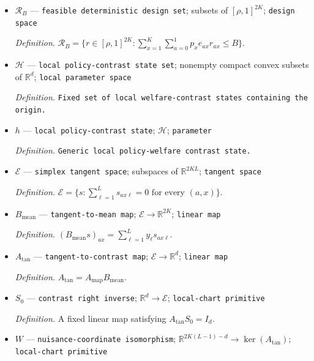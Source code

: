 \documentclass{article}
\begin{document}
\begin{itemize}
  \par\smallskip\noindent\emph{Definition.} \texttt{Maximum expected main-\allowbreak{}wave labeled fraction.}
  \item \(\mathcal R_B\) --- \texttt{feasible deterministic design set}; subsets of \([\rho,1]^{2K}\); \texttt{design space}
  \par\smallskip\noindent\emph{Definition.} \(\mathcal R_B=\{r\in[\rho,1]^{2K}:\sum_{x=1}^{K}\sum_{a=0}^{1}p_xe_{ax}r_{ax}\le B\}\).
  \item \(\mathcal H\) --- \texttt{local policy-\allowbreak{}contrast state set}; nonempty compact convex subsets of \(\mathbb R^d\); \texttt{local parameter space}
  \par\smallskip\noindent\emph{Definition.} \texttt{Fixed set of local welfare-\allowbreak{}contrast states containing the origin.}
  \item \(h\) --- \texttt{local policy-\allowbreak{}contrast state}; \(\mathcal H\); \texttt{parameter}
  \par\smallskip\noindent\emph{Definition.} \texttt{Generic local policy-\allowbreak{}welfare contrast state.}
  \item \(\mathcal E\) --- \texttt{simplex tangent space}; subspaces of \(\mathbb R^{2KL}\); \texttt{tangent space}
  \par\smallskip\noindent\emph{Definition.} \(\mathcal E=\{s:\sum_{\ell=1}^{L}s_{ax\ell}=0\text{ for every }(a,x)\}\).
  \item \(B_{\mathrm{mean}}\) --- \texttt{tangent-\allowbreak{}to-\allowbreak{}mean map}; \(\mathcal E\to\mathbb R^{2K}\); \texttt{linear map}
  \par\smallskip\noindent\emph{Definition.} \((B_{\mathrm{mean}}s)_{ax}=\sum_{\ell=1}^{L}y_\ell s_{ax\ell}\).
  \item \(A_{\mathrm{tan}}\) --- \texttt{tangent-\allowbreak{}to-\allowbreak{}contrast map}; \(\mathcal E\to\mathbb R^d\); \texttt{linear map}
  \par\smallskip\noindent\emph{Definition.} \(A_{\mathrm{tan}}=A_{\mathrm{map}}B_{\mathrm{mean}}\).
  \item \(S_0\) --- \texttt{contrast right inverse}; \(\mathbb R^d\to\mathcal E\); \texttt{local-\allowbreak{}chart primitive}
  \par\smallskip\noindent\emph{Definition.} A fixed linear map satisfying \(A_{\mathrm{tan}}S_0=I_d\).
  \item \(W\) --- \texttt{nuisance-\allowbreak{}coordinate isomorphism}; \(\mathbb R^{2K(L-1)-d}\to\ker(A_{\mathrm{tan}})\); \texttt{local-\allowbreak{}chart primitive}

\end{itemize}
\end{document}
